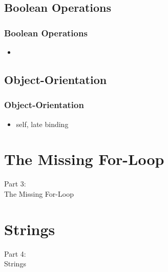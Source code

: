 \subsection{Boolean Operations}
\begin{frame}
    \frametitle{Boolean Operations}
    \vspace{5mm}
    
    \begin{itemize}
      \item
    \end{itemize}
\end{frame}

\subsection{Object-Orientation}
\begin{frame}
    \frametitle{Object-Orientation}
    \vspace{5mm}
    
    \begin{itemize}
      \item self, late binding
    \end{itemize}
\end{frame}


\section{The Missing For-Loop}
\begin{frame}
    \vspace{25mm}
    \begin{center}
        \Huge{Part 3:\\The Missing For-Loop}
    \end{center}
\end{frame}


\section{Strings}
\begin{frame}
    \vspace{25mm}
    \begin{center}
        \Huge{Part 4:\\Strings}
    \end{center}
\end{frame}

